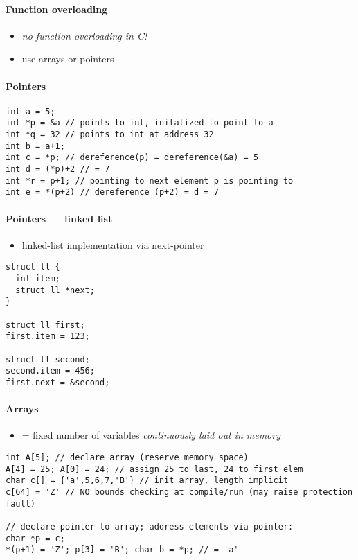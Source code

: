 \paragraph{Function overloading}
\begin{itemize}
  \item \emph{no function overloading in C!}
  \item use arrays or pointers
\end{itemize}

\paragraph{Pointers}
\begin{lstlisting}[style=customc]
int a = 5;
int *p = &a // points to int, initalized to point to a
int *q = 32 // points to int at address 32
int b = a+1;
int c = *p; // dereference(p) = dereference(&a) = 5
int d = (*p)+2 // = 7
int *r = p+1; // pointing to next element p is pointing to
int e = *(p+2) // dereference (p+2) = d = 7
\end{lstlisting}

\paragraph{Pointers --- linked list}
\begin{itemize}
  \item linked-list implementation via next-pointer
\end{itemize}
\begin{lstlisting}[style=customc]
struct ll {
  int item;
  struct ll *next;
}

struct ll first;
first.item = 123;

struct ll second;
second.item = 456;
first.next = &second;
\end{lstlisting}

\paragraph{Arrays}
\begin{itemize}
  \item = fixed number of variables \emph{continuously laid out in memory}
\end{itemize}
\begin{lstlisting}[style=customc]
int A[5]; // declare array (reserve memory space)
A[4] = 25; A[0] = 24; // assign 25 to last, 24 to first elem
char c[] = {'a',5,6,7,'B'} // init array, length implicit
c[64] = 'Z' // NO bounds checking at compile/run (may raise protection fault)

// declare pointer to array; address elements via pointer:
char *p = c;
*(p+1) = 'Z'; p[3] = 'B'; char b = *p; // = 'a'
\end{lstlisting}

